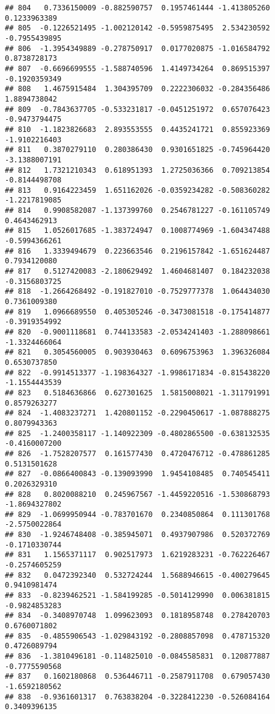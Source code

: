 \documentclass[
]{article}
\begin{document}
\begin{verbatim}
## 804   0.7336150009 -0.882590757  0.1957461444 -1.413805260  0.1233963389
## 805  -0.1226521495 -1.002120142 -0.5959875495  2.534230592 -0.7955439895
## 806  -1.3954349889 -0.278750917  0.0177020875 -1.016584792  0.8738728173
## 807  -0.6696699555 -1.588740596  1.4149734264  0.869515397 -0.1920359349
## 808   1.4675915484  1.304395709  0.2222306032 -0.284356486  1.8894738042
## 809  -0.7843637705 -0.533231817 -0.0451251972  0.657076423 -0.9473794475
## 810  -1.1823826683  2.893553555  0.4435241721  0.855923369 -1.9102216403
## 811   0.3870279110  0.280386430  0.9301651825 -0.745964420 -3.1388007191
## 812   1.7321210343  0.618951393  1.2725036366  0.709213854 -0.8144498708
## 813   0.9164223459  1.651162026 -0.0359234282 -0.508360282 -1.2217819085
## 814   0.9908582087 -1.137399760  0.2546781227 -0.161105749  0.4643462913
## 815   1.0526017685 -1.383724947  0.1008774969 -1.604347488 -0.5994366261
## 816   1.3339494679  0.223663546  0.2196157842 -1.651624487  0.7934120080
## 817   0.5127420083 -2.180629492  1.4604681407  0.184232038 -0.3156803725
## 818  -1.2664268492 -0.191827010 -0.7529777378  1.064434030  0.7361009380
## 819   1.0966689550  0.405305246 -0.3473081518 -0.175414877 -0.3919354992
## 820  -0.9001118681  0.744133583 -2.0534241403 -1.288098661 -1.3324466064
## 821   0.3054560005  0.903930463  0.6096753963  1.396326084  0.6530737850
## 822  -0.9914513377 -1.198364327 -1.9986171834 -0.815438220 -1.1554443539
## 823   0.5184636866  0.627301625  1.5815008021 -1.311791991  0.8579263277
## 824  -1.4083237271  1.420801152 -0.2290450617 -1.087888275  0.8079943363
## 825  -1.2400358117 -1.140922309 -0.4802865500 -0.638132535 -0.4160007200
## 826  -1.7528207577  0.161577430  0.4720476712 -0.478861285  0.5131501628
## 827  -0.0866400843 -0.139093990  1.9454108485  0.740545411  0.2026329310
## 828   0.8020088210  0.245967567 -1.4459220516 -1.530868793 -1.8694327802
## 829  -1.0699950944 -0.783701670  0.2340850864  0.111301768 -2.5750022864
## 830  -1.9246748408 -0.385945071  0.4937907986  0.520372769 -0.1710330744
## 831   1.1565371117  0.902517973  1.6219283231 -0.762226467 -0.2574605259
## 832   0.0472392340  0.532724244  1.5688946615 -0.400279645  0.9410981474
## 833  -0.8239462521 -1.584199285 -0.5014129990  0.006381815 -0.9824853283
## 834  -0.3408970748  1.099623093  0.1818958748  0.278420703  0.6760071802
## 835  -0.4855906543 -1.029843192 -0.2808857098  0.478715320  0.4726089794
## 836  -1.3810496181 -0.114825010 -0.0845585831  0.120877887 -0.7775590568
## 837   0.1602180868  0.536446711 -0.2587911708  0.679057430 -1.6592180562
## 838  -0.9361601317  0.763838204 -0.3228412230 -0.526084164  0.3409396135

\end{verbatim}
\end{document}
